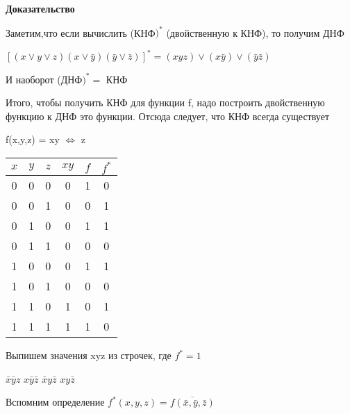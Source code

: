 \documentclass[russian]{lecture-notes}
\begin{document}
    \textbf{Доказательство}

    Заметим,что если вычислить (КНФ$)^{*}$ (двойственную к КНФ), то получим ДНФ

    \begin{example}
        $[(x \vee y \vee z)(x \vee \bar{y})(\bar{y} \vee \bar{z})]^{*} = (xyz)\vee(x\bar{y})\vee(\bar{y}\bar{z})$

        И наоборот (ДНФ$)^{*} = $ КНФ
    \end{example}

    Итого, чтобы получить КНФ для функции f, надо построить двойственную функцию
    к ДНФ это функции. Отсюда следует, что КНФ всегда существует

    \begin{example}
        f(x,y,z) = xy $\Leftrightarrow$ z

        \begin{table}[h!]
            \centering
            \begin{tabular}{|c|c|c|c|c|c|}
                \hline
                $x$ & $y$ & $z$ & $xy$ & $f$ & $f^{*}$ \\ \hline
                0     & 0   & 0   & 0    & 1   & 0       \\ \hline
                0     & 0   & 1   & 0    & 0   & 1       \\ \hline
                0     & 1   & 0   & 0    & 1   & 1       \\ \hline
                0     & 1   & 1   & 0    & 0   & 0       \\ \hline
                1     & 0   & 0   & 0    & 1   & 1       \\ \hline
                1     & 0   & 1   & 0    & 0   & 0       \\ \hline
                1     & 1   & 0   & 1    & 0   & 1       \\ \hline
                1     & 1   & 1   & 1    & 1   & 0       \\ \hline
            \end{tabular}

        \end{table}


        Выпишем значения xyz из строчек, где $f^{*} = 1$

        $\bar{x}\bar{y}z$ \quad $x\bar{y}\bar{z}$ \quad $\bar{x}y\bar{z}$ \quad $xy\bar{z}$


    \end{example}

    Вспомним определение $f^{*}(x,y,z) = \overline{f(\bar{x},\bar{y},\bar{z})}$
\end{document}
